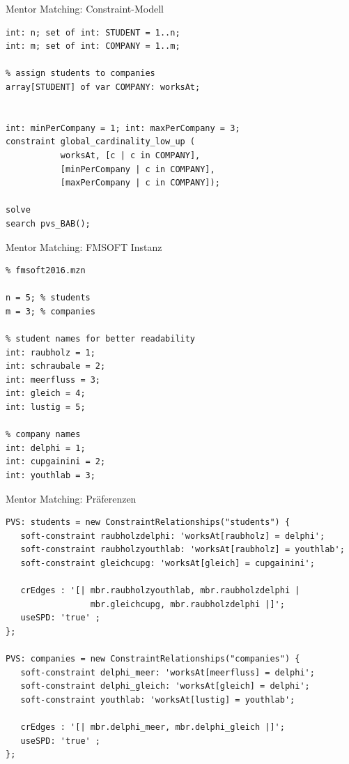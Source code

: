 \begin{frame}[fragile]{Mentor Matching: Constraint-Modell}
\begin{lstlisting}
int: n; set of int: STUDENT = 1..n;
int: m; set of int: COMPANY = 1..m;

% assign students to companies
array[STUDENT] of var COMPANY: worksAt;


int: minPerCompany = 1; int: maxPerCompany = 3;
constraint global_cardinality_low_up ( 
           worksAt, [c | c in COMPANY], 
           [minPerCompany | c in COMPANY], 
           [maxPerCompany | c in COMPANY]); 
           
solve 
search pvs_BAB();
\end{lstlisting}
\end{frame}

\begin{frame}[fragile]{Mentor Matching: FMSOFT Instanz}
\begin{lstlisting}
% fmsoft2016.mzn

n = 5; % students
m = 3; % companies

% student names for better readability 
int: raubholz = 1;
int: schraubale = 2;
int: meerfluss = 3; 
int: gleich = 4; 
int: lustig = 5; 

% company names 
int: delphi = 1;
int: cupgainini = 2;
int: youthlab = 3;

\end{lstlisting}

\end{frame}

\begin{frame}[fragile]{Mentor Matching: Präferenzen}
\begin{lstlisting}
PVS: students = new ConstraintRelationships("students") {
   soft-constraint raubholzdelphi: 'worksAt[raubholz] = delphi';
   soft-constraint raubholzyouthlab: 'worksAt[raubholz] = youthlab';
   soft-constraint gleichcupg: 'worksAt[gleich] = cupgainini';
   
   crEdges : '[| mbr.raubholzyouthlab, mbr.raubholzdelphi | 
                 mbr.gleichcupg, mbr.raubholzdelphi |]';
   useSPD: 'true' ;
}; 

PVS: companies = new ConstraintRelationships("companies") {
   soft-constraint delphi_meer: 'worksAt[meerfluss] = delphi';
   soft-constraint delphi_gleich: 'worksAt[gleich] = delphi';
   soft-constraint youthlab: 'worksAt[lustig] = youthlab';
   
   crEdges : '[| mbr.delphi_meer, mbr.delphi_gleich |]';
   useSPD: 'true' ;
}; 

\end{lstlisting}
\end{frame}

